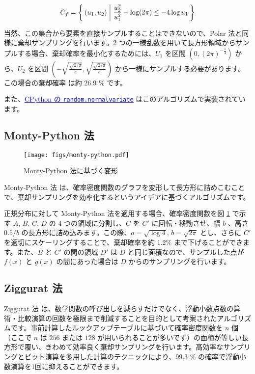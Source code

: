 \documentclass[twocolumn, dvipdfmx]{jsarticle}
\begin{document}
\begin{align*}
    C_f = \Set{ (u_1, u_2) | \frac{u_2^2}{u_1^2} + \log (2 \pi) \leq -4 \log u_1 }
\end{align*}

当然、この集合から要素を直接サンプルすることはできないので、Polar 法と同様に棄却サンプリングを行います。2 つの一様乱数を用いて長方形領域からサンプルする場合、棄却確率を最小化するためには、$U_1$ を区間 $\left(0, (2 \pi)^{-\frac{1}{4}}\right)$ から、$U_2$ を区間 $\left(-\sqrt{\frac{\sqrt{2 / \pi}}{e}}, \sqrt{\frac{\sqrt{2 / \pi}}{e}}\right)$ から一様にサンプルする必要があります。この場合の棄却確率 は約 26.9 \% です。

また、\href{https://github.com/python/cpython/blob/b0dfc7581697f20385813582de7e92ba6ba0105f/Lib/random.py#L529-L548}{\textcolor{blue}{\underline{CPython の \texttt{random.normalvariate}}}} はこのアルゴリズムで実装されています。

\subsection*{Monty-Python 法}

\begin{figure}[t]
    \centering
    \texttt{[image: figs/monty-python.pdf]}
    \caption{Monty-Python 法に基づく変形}
    \label{fig:monty-python-plot}
\end{figure}

Monty-Python 法 \cite{marsaglia1998monty} は、確率密度関数のグラフを変形して長方形に詰めこむことで、棄却サンプリングを効率化するというアイデアに基づくアルゴリズムです。

正規分布に対して Monty-Python 法を適用する場合、確率密度関数を図 \ref{fig:monty-python-plot} で示す $A$, $B$, $C$, $D$ の 4 つの領域に分割し、$C$ を $C'$ に回転・移動させ、幅 $b$ 、高さ $0.5/b$ の長方形に詰め込みます。この際、$a = \sqrt{\log 4}$, $b = \sqrt{2 \pi}$ とし、さらに $C'$ を適切にスケーリングすることで、棄却確率を約 1.2\% まで下げることができます。また、$B$ と $C'$ の間の領域 $D'$ は $D$ と同じ面積なので、サンプルした点が $f(x)$ と $g(x)$ の間にあった場合は $D$ からのサンプリングを行います。

\subsection*{Ziggurat 法}

Ziggurat 法 \cite{marsaglia1984fast, marsaglia2000ziggurat} は、数学関数の呼び出しを減らすだけでなく、浮動小数点数の算術・比較演算の回数を極限まで削減することを目的として考案されたアルゴリズムです。事前計算したルックアップテーブルに基づいて確率密度関数を $n$ 個（ここで $n$ は $256$ または $128$ が用いられることが多いです）の面積が等しい長方形で覆い、きわめて効率良く棄却サンプリングを行います。高効率なサンプリングとビット演算を多用した計算のテクニックにより、99.3 \% の確率で浮動小数演算を1回に抑えることができます。
\end{document}
